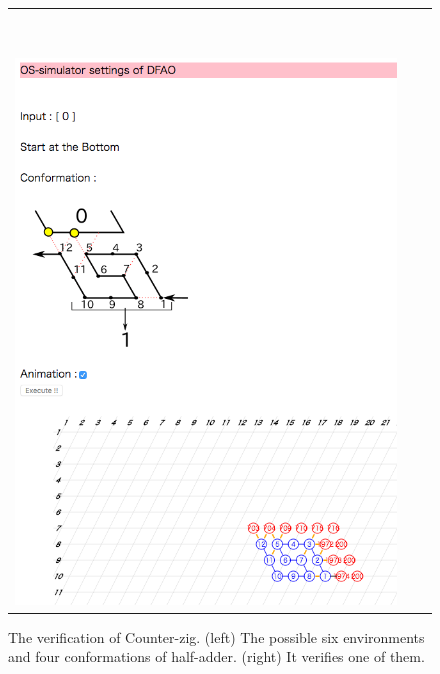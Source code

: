 \begin{figure}[htb]
\begin{tabular}{ccc}
\begin{minipage}{0.1\hsize}
\ 
\end{minipage}
 
 \begin{minipage}{0.4\hsize}
  \begin{center}
  \includegraphics[width=\linewidth]{pic/Co-zig2.png}
  \end{center}
 \end{minipage}
 
\end{tabular}
\caption{The verification of Counter-zig. (left) The possible six environments and four conformations of half-adder. (right) It verifies one of them.}
\label{fig:Verification_half-adder}

\end{figure}


